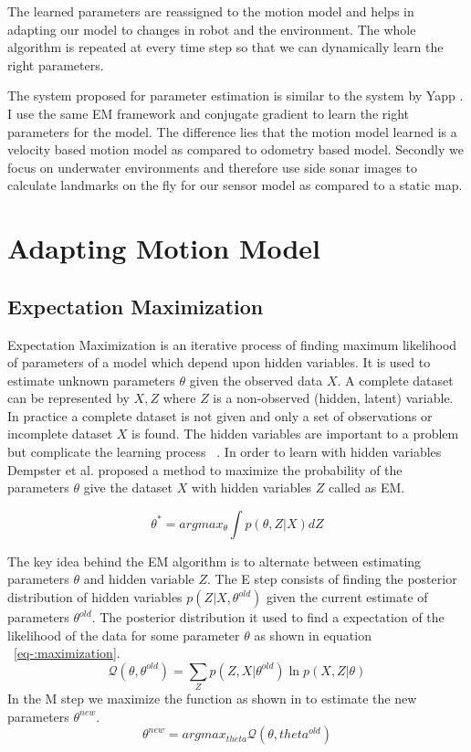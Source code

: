 \documentclass[12pt]{dalcsthesis}
\begin{document}
The learned parameters are reassigned to the motion model and helps in adapting our model to changes in robot and the environment. The whole algorithm is repeated at every time step so that we can dynamically learn the right parameters.

The system proposed for parameter estimation is similar to the system by Yapp \cite{Yap2008}. I use the same EM framework and conjugate gradient to learn the right parameters for the model. The difference lies that the motion model learned is a velocity based motion model as compared to odometry based model. Secondly we focus on underwater environments and therefore use side sonar images to calculate landmarks on the fly for our sensor model as compared to a static map.

\section{Adapting Motion Model}
\label{adapting the motion model}
\subsection{Expectation Maximization}

Expectation Maximization is an iterative process of finding maximum likelihood of parameters of a model which depend upon hidden variables. It is used to estimate unknown parameters $\theta$ given the observed data $X$. A complete dataset can be represented by ${X,Z}$ where $Z$ is a non-observed (hidden, latent) variable. In practice a complete dataset is not given and only a set of observations or incomplete dataset $X$ is found. The hidden variables are important to a problem but complicate the learning process ~\cite{russell2003artificial}. In order to learn with hidden variables Dempster et al. \cite{dempster1977maximum} proposed a method to maximize the probability of the parameters $\theta$ give the dataset $X$ with hidden variables $Z$ called as EM.

\begin{equation}
\label{eq-:em_description}
\theta^{*}=arg max_{\theta} \int p(\theta,Z|X)dZ
\end{equation}

The key idea behind the EM algorithm is to alternate between estimating parameters $\theta$ and hidden variable $Z$.
The E step consists of finding the posterior distribution of hidden variables $p(Z|X,\theta^{old})$ given the current estimate of parameters $\theta^{old}$. The posterior distribution it used to find a expectation of the likelihood of the data for some parameter $\theta$ as shown in equation ~\ref{eq-:maximization}. 
\begin{equation}
\label{eq-:maximization}
\mathcal{Q}(\theta,\theta^{old})=\sum_{Z}p(Z,X|\theta^{old}) \ln p(X,Z|\theta)
\end{equation}
In the M step we maximize the function as shown in  to estimate the new parameters $\theta^{new}$.
\begin{equation}
\theta^{new}=arg max_{theta} \mathcal{Q}(\theta,theta^{old})
\end{equation}
\end{document}
